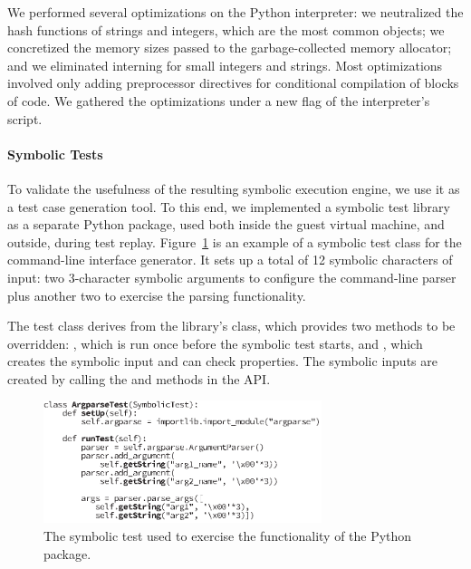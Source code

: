 We performed several optimizations on the Python interpreter: we neutralized the hash functions of strings and integers, which are the most common objects; we concretized the memory sizes passed to the garbage-collected memory allocator; and we eliminated interning for small integers and strings.    
%
Most optimizations involved only adding preprocessor directives for conditional compilation of blocks of code.
%
We gathered the optimizations under a new  flag of the interpreter's  script.

\paragraph{Symbolic Tests}

To validate the usefulness of the resulting symbolic execution engine, we use it as a test case generation tool.  To this end, we implemented a symbolic test library as a separate Python package, used both inside the guest virtual machine, and outside, during test replay.
%
Figure~\ref{fig:sample-test} is an example of a symbolic test class for the  command-line interface generator. It sets up a total of 12 symbolic characters of input: two 3-character symbolic arguments to configure the command-line parser plus another two to exercise the parsing functionality.

The test class derives from the library's  class, which provides two methods to be overridden: , which is run once before the symbolic test starts, and , which creates the symbolic input and can check properties.  The symbolic inputs are created by calling the  and  methods in the  API.

\begin{figure}
  \centering
  \includegraphics[width=3.2in]{figures/evaluation/symtest}
  \caption{The symbolic test used to exercise the functionality of the Python  package.}
  \label{fig:sample-test}
\end{figure}

